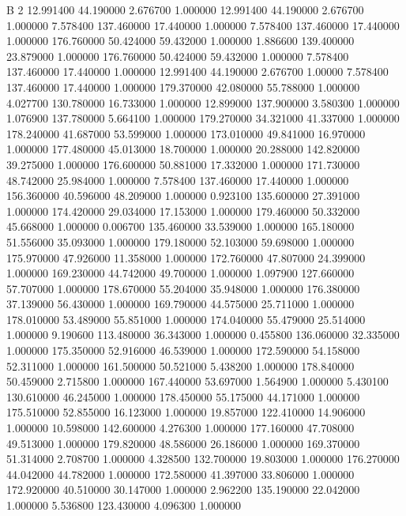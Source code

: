


B    2
12.991400 44.190000   2.676700   1.000000
12.991400 44.190000   2.676700   1.000000
7.578400 137.460000  17.440000   1.000000
7.578400 137.460000  17.440000   1.000000
176.760000  50.424000  59.432000   1.000000
  1.886600 139.400000  23.879000   1.000000
  176.760000  50.424000  59.432000   1.000000
  7.578400 137.460000  17.440000   1.000000
  12.991400 44.190000   2.676700   1.00000
  7.578400 137.460000  17.440000   1.000000
179.370000  42.080000  55.788000   1.000000
  4.027700 130.780000  16.733000   1.000000
 12.899000 137.900000   3.580300   1.000000
  1.076900 137.780000   5.664100   1.000000
179.270000  34.321000  41.337000   1.000000
178.240000  41.687000  53.599000   1.000000
173.010000  49.841000  16.970000   1.000000
177.480000  45.013000  18.700000   1.000000
 20.288000 142.820000  39.275000   1.000000
176.600000  50.881000  17.332000   1.000000
171.730000  48.742000  25.984000   1.000000
  7.578400 137.460000  17.440000   1.000000
156.360000  40.596000  48.209000   1.000000
  0.923100 135.600000  27.391000   1.000000
174.420000  29.034000  17.153000   1.000000
179.460000  50.332000  45.668000   1.000000
  0.006700 135.460000  33.539000   1.000000
165.180000  51.556000  35.093000   1.000000
179.180000  52.103000  59.698000   1.000000
175.970000  47.926000  11.358000   1.000000
172.760000  47.807000  24.399000   1.000000
169.230000  44.742000  49.700000   1.000000
  1.097900 127.660000  57.707000   1.000000
178.670000  55.204000  35.948000   1.000000
176.380000  37.139000  56.430000   1.000000
169.790000  44.575000  25.711000   1.000000
178.010000  53.489000  55.851000   1.000000
174.040000  55.479000  25.514000   1.000000
  9.190600 113.480000  36.343000   1.000000
  0.455800 136.060000  32.335000   1.000000
175.350000  52.916000  46.539000   1.000000
172.590000  54.158000  52.311000   1.000000
161.500000  50.521000   5.438200   1.000000
178.840000  50.459000   2.715800   1.000000
167.440000  53.697000   1.564900   1.000000
  5.430100 130.610000  46.245000   1.000000
178.450000  55.175000  44.171000   1.000000
175.510000  52.855000  16.123000   1.000000
 19.857000 122.410000  14.906000   1.000000
 10.598000 142.600000   4.276300   1.000000
177.160000  47.708000  49.513000   1.000000
179.820000  48.586000  26.186000   1.000000
169.370000  51.314000   2.708700   1.000000
  4.328500 132.700000  19.803000   1.000000
176.270000  44.042000  44.782000   1.000000
172.580000  41.397000  33.806000   1.000000
172.920000  40.510000  30.147000   1.000000
  2.962200 135.190000  22.042000   1.000000
  5.536800 123.430000   4.096300   1.000000
